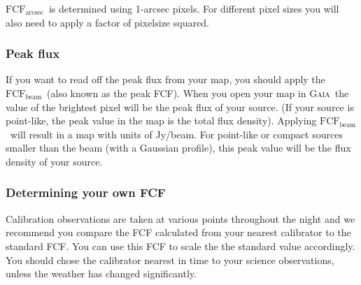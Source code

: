 \documentclass[twoside,11pt]{article}
\newcommand{\xref}[3]{#1}
\renewcommand{\_}{\texttt{\symbol{95}}}
\newcommand{\fcfb}{$\mathrm{FCF_{beam}}$}
\newcommand{\fcfa}{$\mathrm{FCF_{arcsec}}$}
\newcommand{\gaia}{\xref{\textsc{Gaia}}{sun214}{}}
\begin{document}
\fcfa\ is determined using 1-arcsec pixels. For different pixel sizes
you will also need to apply a factor of pixelsize squared.

\subsubsection{Peak flux}

If you want to read off the peak flux from your map, you should apply
the \fcfb\ (also known as the peak FCF).  When you open your map in
\gaia\ the value of the brightest pixel will be the peak flux of your
source. (If your source is point-like, the peak value in the map is
the total flux density). Applying \fcfb\ will result in a map with
units of Jy/beam. For point-like or compact sources smaller than the
beam (with a Gaussian profile), this peak value will be the flux
density of your source.

\subsubsection{Determining your own FCF}

Calibration observations are taken at various points throughout the
night and we recommend you compare the FCF calculated from your
nearest calibrator to the standard FCF. You can use this FCF to scale
the the standard value accordingly. You should chose the calibrator
nearest in time to your science observations, unless the weather has
changed significantly.
\end{document}
